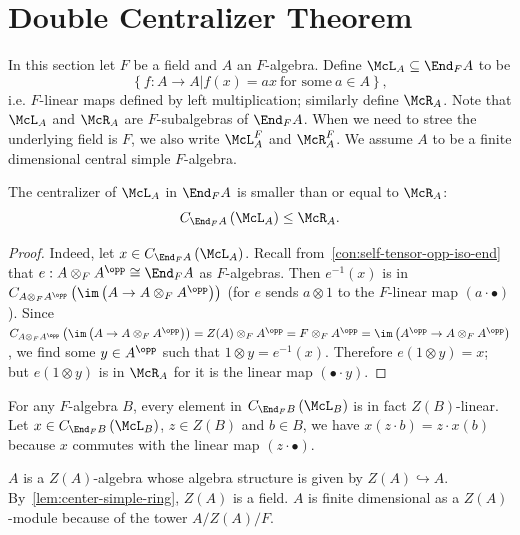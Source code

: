 \section{Double Centralizer Theorem}\label{sec:double-centralizer}

In this section let $F$ be a field and $A$ an $F$-algebra. Define
$\McL_{A} \subseteq \End_{F}A$ to be
\[\left\{f : A \to A|f(x)=ax~\text{for some}~a\in A\right\},\]
i.e. $F$-linear maps defined by left multiplication; similarly define
$\McR_{A}$. Note that $\McL_{A}$ and $\McR_A$ are $F$-subalgebras of
$\End_{F}A$. When we need to stree the underlying field is $F$, we also write
$\McL_{A}^{F}$ and $\McR_{A}^{F}$. We assume $A$ to be a finite dimensional
central simple $F$-algebra.
\begin{lemma}
  \label{lem:centralizer-mul-left-le}
  The centralizer of $\McL_{A}$ in $\End_{F}A$ is smaller than or equal to
  $\McR_{A}$:
  \[
    C_{\End_{F}A}\left(\McL_{A}\right) \le \McR_{A}.
  \]
  \leanok
\end{lemma}

\begin{proof}
  Indeed, let $x \in C_{\End_{F}A}\left(\McL_{A}\right)$. Recall
  from~\cref{con:self-tensor-opp-iso-end} that
  $e : A\otimes_{F}A^{\opp}\cong \End_{F}A$ as $F$-algebras. Then $e^{-1}(x)$ is
  in
  $C_{A\otimes_{F}A^{\opp}}\left(\im\left(A\to A\otimes_{F}A^{\opp}\right)\right)$
  (for $e$ sends $a\otimes 1$ to the $F$-linear map $(a\cdot\bullet)$). Since
  $C_{A\otimes_{F}A^{\opp}}\left(\im\left(A\to A\otimes_{F}A^{\opp}\right)\right) = Z(A)\otimes_{F}A^{\opp}=F\otimes_{F}A^{\opp}=\im\left(A^{\opp}\to A\otimes_{F}A^{\opp}\right)$,
  we find some $y\in A^{\opp}$ such that $1 \otimes y = e^{-1}(x)$. Therefore
  $e\left(1\otimes y\right) = x$; but $e\left(1\otimes y\right)$ is in
  $\McR_{A}$ for it is the linear map $(\bullet\cdot y)$.
\end{proof}

\begin{remark}\label{rem:mul-left-center-linear}
  For any $F$-algebra $B$, every element in $C_{\End_{F}B}\left(\McL_{B}\right)$
  is in fact $Z(B)$-linear. Let $x\in C_{\End_{F}B}\left(\McL_{B}\right)$,
  $z\in Z(B)$ and $b \in B$, we have $x(z\cdot b) = z\cdot x(b)$ because $x$
  commutes with the linear map $\left(z\cdot\bullet\right)$.
\end{remark}

\begin{remark}
  $A$ is a $Z(A)$-algebra whose algebra structure is given by
  $Z(A)\hookrightarrow A$. By~\cref{lem:center-simple-ring}, $Z(A)$ is a field.
  $A$ is finite dimensional as a $Z(A)$-module because of the tower $A/Z(A)/F$.
\end{remark}

